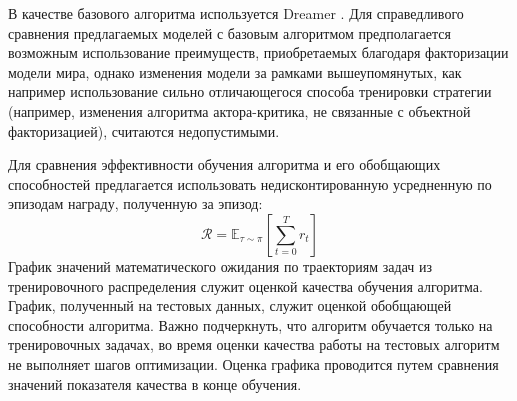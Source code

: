 В качестве базового алгоритма используется Dreamer \cite{dreamer}.
Для справедливого сравнения предлагаемых моделей с базовым алгоритмом предполагается возможным использование преимуществ, приобретаемых благодаря факторизации модели мира, однако изменения модели за рамками вышеупомянутых, как например использование сильно отличающегося способа тренировки стратегии (например, изменения алгоритма актора-критика, не связанные с объектной факторизацией), считаются недопустимыми.

Для сравнения эффективности обучения алгоритма и его обобщающих способностей предлагается использовать недисконтированную усредненную по эпизодам награду, полученную за эпизод:
\begin{equation}
    \mathcal{R} = \mathbb{E}_{\tau \sim \pi}\left[\sum_{t=0}^{T} r_t\right]
\end{equation}
График значений математического ожидания по траекториям задач из тренировочного распределения служит оценкой качества обучения алгоритма.
График, полученный на тестовых данных, служит оценкой обобщающей способности алгоритма.
Важно подчеркнуть, что алгоритм обучается только на тренировочных задачах, во время оценки качества работы на тестовых алгоритм не выполняет шагов оптимизации.
Оценка графика проводится путем сравнения значений показателя качества в конце обучения.